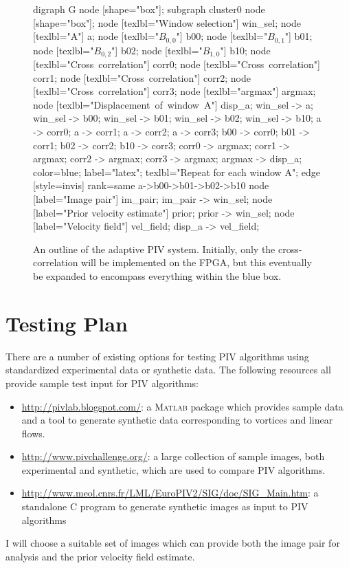 \documentclass{article}
\begin{document}
	\begin{figure}[h!]
	\begin{dot2tex}[dot,options=--autosize]
	digraph G {
	node [shape="box"];
	subgraph cluster0 {
		node [shape="box"];
		node [texlbl="Window selection"] win_sel;
		node [texlbl="A"] a;
		node [texlbl="$B_{0,0}$"] b00;
		node [texlbl="$B_{0,1}$"] b01;
		node [texlbl="$B_{0,2}$"] b02;
		node [texlbl="$B_{1,0}$"] b10;
		node [texlbl="Cross\ correlation"] corr0;
		node [texlbl="Cross\ correlation"] corr1;
		node [texlbl="Cross\ correlation"] corr2;
		node [texlbl="Cross\ correlation"] corr3;
		node [texlbl="argmax"] argmax;
		node [texlbl="Displacement\ of\ window\ A"] disp_a;
		win_sel -> a;
		win_sel -> b00;
		win_sel -> b01;
		win_sel -> b02;
		win_sel -> b10;
		a -> corr0;
		a -> corr1;
		a -> corr2;
		a -> corr3;
		b00 -> corr0;
		b01 -> corr1;
		b02 -> corr2;
		b10 -> corr3;
		corr0 -> argmax;
		corr1 -> argmax;
		corr2 -> argmax;
		corr3 -> argmax;
		argmax -> disp_a;
		color=blue;
		label="latex";
		texlbl="\hspace{4 in}Repeat for each window A";
		edge [style=invis]
		rank=same {a->b00->b01->b02->b10}
	}
	node [label="Image pair"] im_pair;
	im_pair -> win_sel;
	node [label="Prior velocity estimate"] prior;
	prior -> win_sel;
	node [label="Velocity field"] vel_field;
	disp_a -> vel_field;
	}
	\end{dot2tex}
	\caption{An outline of the adaptive PIV system. Initially, only the cross-correlation will be implemented on the FPGA, but this eventually be expanded to encompass everything within the blue box.}
	\end{figure}

	\section{Testing Plan} %
	\label{sec:testing_plan}
	There are a number of existing options for testing PIV algorithms using standardized experimental data or synthetic data. The following resources all provide sample test input for PIV algorithms:
	\begin{itemize}
	\item \url{http://pivlab.blogspot.com/}: a \textsc{Matlab} package which provides sample data and a tool to generate synthetic data corresponding to vortices and linear flows.
	\item \url{http://www.pivchallenge.org/}: a large collection of sample images, both experimental and synthetic, which are used to compare PIV algorithms.
	\item \url{http://www.meol.cnrs.fr/LML/EuroPIV2/SIG/doc/SIG_Main.htm}: a standalone C program to generate synthetic images as input to PIV algorithms
	\end{itemize}
	I will choose a suitable set of images which can provide both the image pair for analysis and the prior velocity field estimate. 

	
	
\end{document}
